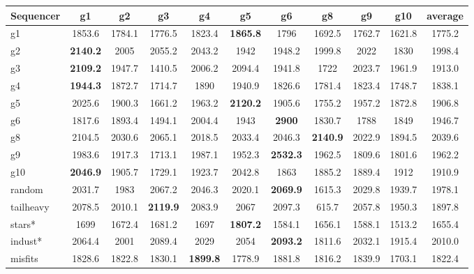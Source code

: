 \medskip
\begin{center}
\begin{tabular}{| l | @{}c | @{}c | @{}c | @{}c | @{}c | @{}c | @{}c | @{}c | @{}c | @{}c |}
\hline
Sequencer & g1 & g2 & g3 & g4 & g5 & g6 & g8 & g9 & g10 & average \\
\hline
g1 & 1853.6 & 1784.1 & 1776.5 & 1823.4 & {\bf \color{red} 1865.8} & 1796 & 1692.5 & 1762.7 & 1621.8 & 1775.2 \\
\hline
g2 & {\bf \color{red} 2140.2} & 2005 & 2055.2 & 2043.2 & 1942 & 1948.2 & 1999.8 & 2022 & 1830 & 1998.4 \\
\hline
g3 & {\bf \color{red} 2109.2} & 1947.7 & 1410.5 & 2006.2 & 2094.4 & 1941.8 & 1722 & 2023.7 & 1961.9 & 1913.0 \\
\hline
g4 & {\bf \color{red} 1944.3} & 1872.7 & 1714.7 & 1890 & 1940.9 & 1826.6 & 1781.4 & 1823.4 & 1748.7 & 1838.1 \\
\hline
g5 & 2025.6 & 1900.3 & 1661.2 & 1963.2 & {\bf \color{red} 2120.2} & 1905.6 & 1755.2 & 1957.2 & 1872.8 & 1906.8 \\
\hline
g6 & 1817.6 & 1893.4 & 1494.1 & 2004.4 & 1943 & {\bf \color{red} 2900} & 1830.7 & 1788 & 1849 & 1946.7 \\
\hline
g8 & 2104.5 & 2030.6 & 2065.1 & 2018.5 & 2033.4 & 2046.3 & {\bf \color{red} 2140.9} & 2022.9 & 1894.5 & 2039.6 \\
\hline
g9 & 1983.6 & 1917.3 & 1713.1 & 1987.1 & 1952.3 & {\bf \color{red} 2532.3} & 1962.5 & 1809.6 & 1801.6 & 1962.2 \\
\hline
g10& {\bf \color{red} 2046.9} & 1905.7 & 1729.1 & 1923.7 & 2042.8 & 1863 & 1885.2 & 1889.4 & 1912 & 1910.9 \\
\hline
random &2031.7 & 1983 & 2067.2 & 2046.3 & 2020.1 & {\bf \color{red} 2069.9} & 1615.3 & 2029.8 & 1939.7 & 1978.1 \\
\hline
tailheavy &2078.5 & 2010.1 & {\bf \color{red} 2119.9} & 2083.9 & 2067 & 2097.3 & 615.7 & 2057.8 & 1950.3 & 1897.8 \\
\hline
stars* &1699 & 1672.4 & 1681.2 & 1697 & {\bf \color{red} 1807.2} & 1584.1 & 1656.1 & 1588.1 & 1513.2 & 1655.4 \\
\hline
indust* &2064.4 & 2001 & 2089.4 & 2029 & 2054 & {\bf \color{red} 2093.2} & 1811.6 & 2032.1 & 1915.4 & 2010.0 \\
\hline
misfits &1828.6 & 1822.8 & 1830.1 & {\bf \color{red} 1899.8} & 1778.9 & 1881.8 & 1816.2 & 1839.9 & 1703.1 & 1822.4 \\
\hline
\end{tabular}
\end{center}

